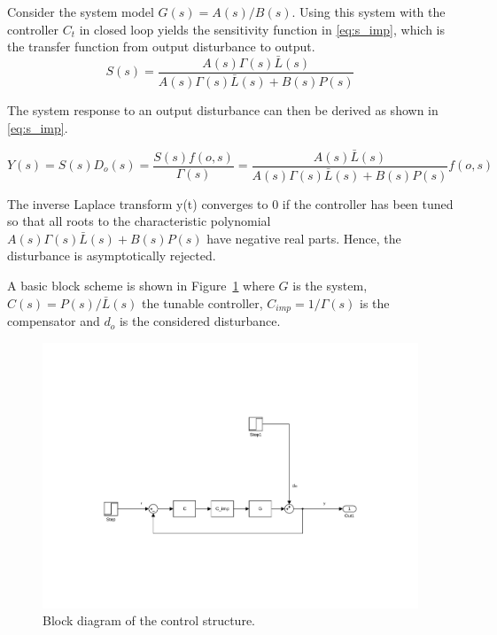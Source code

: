 Consider the system model $G(s) = A(s)/B(s)$. Using this system with the controller $C_t$ in closed loop yields the sensitivity function in \eqref{eq:s_imp}, which is the transfer function from output disturbance to output.
\begin{equation}
  \label{eq:s_imp}
  S(s) = \frac{A(s)\Gamma(s)\bar{L}(s)}{A(s)\Gamma(s)\bar{L}(s) + B(s)P(s)}
\end{equation}

The system response to an output disturbance can then be derived as shown in \eqref{eq:s_imp}.

\begin{equation}
  \label{eq:y_imp}
  Y(s) = S(s)D_o(s) = \frac{S(s)f(o,s)}{\Gamma(s)} = \frac{A(s)\bar{L}(s)}{A(s)\Gamma(s)\bar{L}(s) + B(s)P(s)}f(o,s)
\end{equation}

The inverse Laplace transform y(t) converges to 0 if the controller has been tuned so that all roots to the characteristic polynomial $A(s)\Gamma(s)\bar{L}(s) + B(s)P(s)$ have negative real parts. Hence, the disturbance is asymptotically rejected.

A basic block scheme is shown in Figure~\ref{fig:imp} where $G$ is the system, $C(s) = P(s)/\bar{L}(s)$ the tunable controller, $C_{imp} = 1/\Gamma(s)$ is the compensator and $d_o$ is the considered disturbance.

\begin{figure}[h]
  \centering %
  \includegraphics[width=1\textwidth, trim=6.5cm 5.5cm 5.97cm 11cm, clip=true]{fig/matlab/imp}
  \caption{\label{fig:imp}Block diagram of the \abbrIMP control structure.}
\end{figure}

